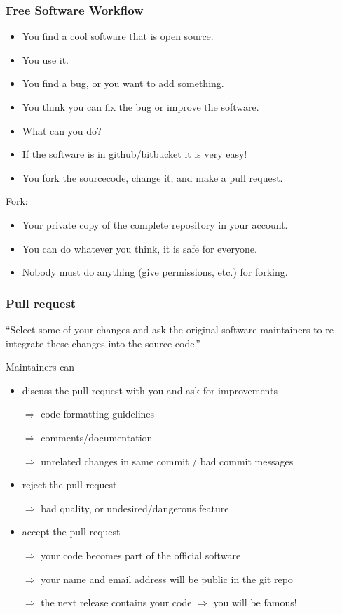 \documentclass[ignoreframetext,envcountsect]{beamer}
\newif\ifsnop\snoptrue
\newcommand{\bi}{\begin{itemize}}
\newcommand{\ei}{\end{itemize}}
\newcommand{\cemph}[1]{{\color{red}#1}}
\begin{document}
\ifsnop
\begin{frame}
\frametitle{Free Software Workflow}
\bi
\item You find a cool software that is open source.
\item You use it.
\item You find a bug, or you want to add something.
\item You think you can fix the bug or improve the software.
\item What can you do?
\pause
\item If the software is in github/bitbucket it is very easy!
\item You \cemph{fork} the sourcecode, change it, and make a \cemph{pull request}.
\ei

\medskip
Fork:
\bi
\item Your private copy of the complete repository in your account.
\item You can do whatever you think, it is safe for everyone.
\item Nobody must do anything (give permissions, etc.) for forking.
\ei
\end{frame}
\fi

\ifsnop
\begin{frame}
\frametitle{Pull request}
``Select some of your changes
and ask the original software maintainers
to \cemph{re-integrate} these changes into the source code.''
\medskip

Maintainers can
\bi
\item discuss the pull request with you and ask for improvements
  
  $\Rightarrow$ code formatting guidelines

  $\Rightarrow$ comments/documentation

  $\Rightarrow$ unrelated changes in same commit / bad commit messages
\item reject the pull request

  $\Rightarrow$ bad quality, or undesired/dangerous feature
\item accept the pull request

  $\Rightarrow$ your code becomes part of the official software
  
  $\Rightarrow$ your name and email address will be public in the git repo

  $\Rightarrow$ the next release contains your code $\Rightarrow$ you will be \cemph{famous!}
\ei
\end{frame}
\fi
\end{document}
